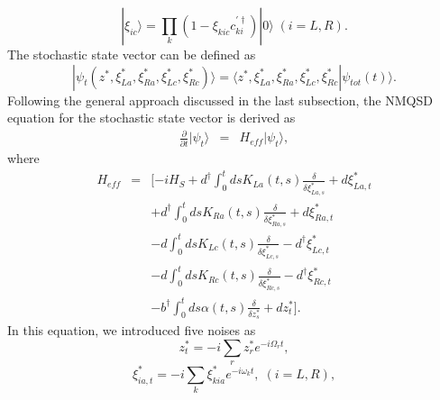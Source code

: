 \documentclass[preprint]{elsarticle}
\begin{document}
\begin{equation}
|\xi_{ic}\rangle=\prod_{k}(1-\xi_{kic}c_{ki}^{\prime\dagger})|0\rangle\;(i=L,R).
\end{equation}
The stochastic state vector can be defined as
\begin{equation}
|\psi_{t}(z^{*},\xi_{La}^{*},\xi_{Ra}^{*},\xi_{Lc}^{*},\xi_{Rc}^{*})\rangle=\langle z^{*},\xi_{La}^{*},\xi_{Ra}^{*},\xi_{Lc}^{*},\xi_{Rc}^{*}|\psi_{tot}(t)\rangle.
\end{equation}
Following the general approach discussed in the last subsection, the
NMQSD equation for the stochastic state vector is derived as
\begin{eqnarray}
\frac{\partial}{\partial t}|\psi_{t}\rangle & = & H_{eff}|\psi_{t}\rangle,
\end{eqnarray}
where 
\begin{eqnarray}
H_{eff} & = & [-iH_{S}+d^{\dagger}\int_{0}^{t}dsK_{La}(t,s)\frac{\delta}{\delta\xi_{La,s}^{*}}+d\xi_{La,t}^{*}\nonumber \\
 &  & +d^{\dagger}\int_{0}^{t}dsK_{Ra}(t,s)\frac{\delta}{\delta\xi_{Ra,s}^{*}}+d\xi_{Ra,t}^{*}\nonumber \\
 &  & -d\int_{0}^{t}dsK_{Lc}(t,s)\frac{\delta}{\delta\xi_{Lc,s}^{*}}-d^{\dagger}\xi_{Lc,t}^{*}\nonumber \\
 &  & -d\int_{0}^{t}dsK_{Rc}(t,s)\frac{\delta}{\delta\xi_{Rc,s}^{*}}-d^{\dagger}\xi_{Rc,t}^{*}\nonumber \\
 &  & -b^{\dagger}\int_{0}^{t}ds\alpha(t,s)\frac{\delta}{\delta z_{s}^{*}}+dz_{t}^{*}].
\end{eqnarray}
In this equation, we introduced five noises as
\begin{equation}
z_{t}^{*}=-i\sum_{r}z_{r}^{*}e^{-i\Omega_{r}t},
\end{equation}
\begin{equation}
\xi_{ia,t}^{*}=-i\sum_{k}\xi_{kia}^{*}e^{-i\omega_{k}t},\;(i=L,R),
\end{equation}
\end{document}
